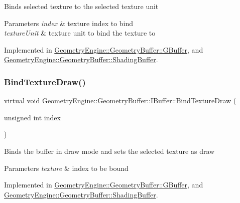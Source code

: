 Binds selected texture to the selected texture unit 
\begin{DoxyParams}{Parameters}
{\em index} & texture index to bind \\
\hline
{\em texture\+Unit} & texture unit to bind the texture to \\
\hline
\end{DoxyParams}


Implemented in \mbox{\hyperlink{class_geometry_engine_1_1_geometry_buffer_1_1_g_buffer_a9a6d75cdb98cc00e34648f5f423382f1}{Geometry\+Engine\+::\+Geometry\+Buffer\+::\+G\+Buffer}}, and \mbox{\hyperlink{class_geometry_engine_1_1_geometry_buffer_1_1_shading_buffer_ad700e0216094073a3c441de7ed22b816}{Geometry\+Engine\+::\+Geometry\+Buffer\+::\+Shading\+Buffer}}.

\mbox{\label{class_geometry_engine_1_1_geometry_buffer_1_1_i_buffer_ac5b3fcf3ea4dfc4e5530cb0f4a9005a6}} 
\subsubsection{\texorpdfstring{BindTextureDraw()}{BindTextureDraw()}}
{\footnotesize\ttfamily virtual void Geometry\+Engine\+::\+Geometry\+Buffer\+::\+I\+Buffer\+::\+Bind\+Texture\+Draw (\begin{DoxyParamCaption}\item[{unsigned int}]{index }\end{DoxyParamCaption})\hspace{0.3cm}{\ttfamily [pure virtual]}}

Binds the buffer in draw mode and sets the selected texture as draw 
\begin{DoxyParams}{Parameters}
{\em texture} & index to be bound \\
\hline
\end{DoxyParams}


Implemented in \mbox{\hyperlink{class_geometry_engine_1_1_geometry_buffer_1_1_g_buffer_ab14f2b1778d7415674b67c3349392cc9}{Geometry\+Engine\+::\+Geometry\+Buffer\+::\+G\+Buffer}}, and \mbox{\hyperlink{class_geometry_engine_1_1_geometry_buffer_1_1_shading_buffer_ab7598c22cfdc926a5fea29734160c10b}{Geometry\+Engine\+::\+Geometry\+Buffer\+::\+Shading\+Buffer}}.

